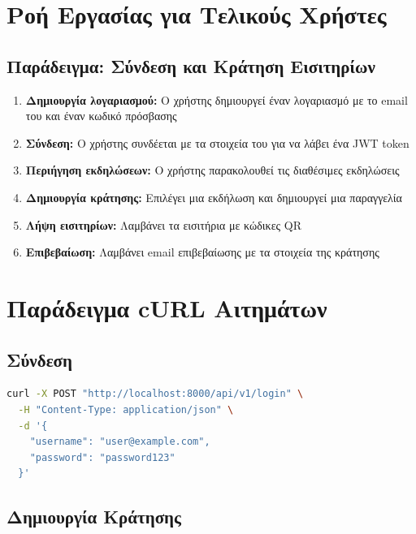 \documentclass[12pt,a4paper]{report}
\begin{document}
\section{Ροή Εργασίας για Τελικούς Χρήστες}

\subsection{Παράδειγμα: Σύνδεση και Κράτηση Εισιτηρίων}

\begin{enumerate}
    \item \textbf{Δημιουργία λογαριασμού:} Ο χρήστης δημιουργεί έναν λογαριασμό με το email του και έναν κωδικό πρόσβασης
    
    \item \textbf{Σύνδεση:} Ο χρήστης συνδέεται με τα στοιχεία του για να λάβει ένα JWT token
    
    \item \textbf{Περιήγηση εκδηλώσεων:} Ο χρήστης παρακολουθεί τις διαθέσιμες εκδηλώσεις
    
    \item \textbf{Δημιουργία κράτησης:} Επιλέγει μια εκδήλωση και δημιουργεί μια παραγγελία
    
    \item \textbf{Λήψη εισιτηρίων:} Λαμβάνει τα εισιτήρια με κώδικες QR
    
    \item \textbf{Επιβεβαίωση:} Λαμβάνει email επιβεβαίωσης με τα στοιχεία της κράτησης
\end{enumerate}

\section{Παράδειγμα cURL Αιτημάτων}

\subsection{Σύνδεση}

\begin{lstlisting}[language=bash, caption=Login Request]
curl -X POST "http://localhost:8000/api/v1/login" \
  -H "Content-Type: application/json" \
  -d '{
    "username": "user@example.com",
    "password": "password123"
  }'
\end{lstlisting}

\subsection{Δημιουργία Κράτησης}
\end{document}
